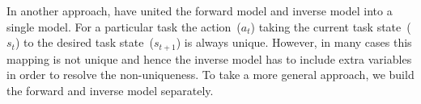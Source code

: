 

In another approach, \citet{petkos2006learning} have united the
forward model and inverse model into
a single model. For a particular task %
the action~($a_t$) taking the current task state~($s_t$) to the
desired task state~($s_{t+1}$) is always unique. However, in many
cases this mapping is not unique and hence the inverse model has to
include extra variables in order to resolve the non-uniqueness. To
take a more general approach, we build the forward and inverse model
separately. %

